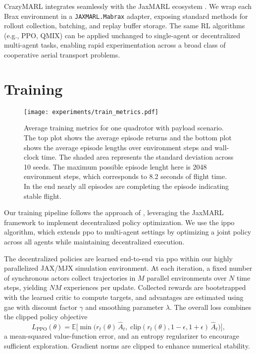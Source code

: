 CrazyMARL integrates seamlessly with the JaxMARL ecosystem \cite{flair2023jaxmarl}.  We wrap each Brax environment in a \texttt{JAXMARL.Mabrax} adapter, exposing standard methods for rollout collection, batching, and replay buffer storage.  The same RL algorithms (e.g., PPO, QMIX) can be applied unchanged to single-agent or decentralized multi-agent tasks, enabling rapid experimentation across a broad class of cooperative aerial transport problems.


\section{Training}
\begin{figure}[ht]
    \centering
    
    \texttt{[image: experiments/train\_metrics.pdf]}
    \caption{Average training metrics for one quadrotor with payload scenario. The top plot shows the average episode returns and the bottom plot shows the average episode lengths over environment steps and wall-clock time. The shaded area represents the standard deviation across 10 seeds. The maximum possible episode lenght here is 2048 environment steps, which corresponds to 8.2 seconds of flight time. In the end nearly all episodes are completing the episode indicating stable flight.}
    \label{fig:train_metrics}
\end{figure}
Our training pipeline follows the approach of \autocite{flair2023jaxmarl}, leveraging the JaxMARL framework to implement decentralized policy optimization. We use the \gls{ippo} algorithm, which extends \gls{ppo} to multi-agent settings by optimizing a joint policy across all agents while maintaining decentralized execution.

The decentralized policies are learned end-to-end via \gls{ppo} within our highly parallelized JAX/MJX simulation environment. At each iteration, a fixed number of synchronous actors collect trajectories in $M$ parallel environments over $N$ time steps, yielding $NM$ experiences per update. Collected rewards are bootstrapped with the learned critic to compute targets, and advantages are estimated using \gls{gae} with discount factor $\gamma$ and smoothing parameter $\lambda$. The overall loss combines the clipped policy objective
\[
L_{\mathrm{PPO}}(\theta) = \mathbb{E}\!\bigl[\min\bigl(r_t(\theta)\,\hat{A}_t,\;\mathrm{clip}(r_t(\theta),1-\epsilon,1+\epsilon)\,\hat{A}_t\bigr)\bigr],
\]
a mean-squared value-function error, and an entropy regularizer to encourage sufficient exploration. Gradient norms are clipped to enhance numerical stability.

